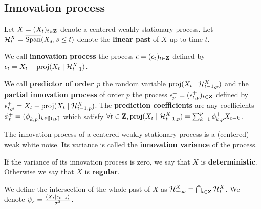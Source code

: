 \subsection{Innovation process}

	Let $X = (X_t)_{t \in \mathbf{Z}}$ denote a centered weakly stationary process.
	Let $\mathcal{H}_t^X = \overline{\operatorname{Span}}(X_s, s \leq t)$ denote the \textbf{linear past} of $X$ up to time $t$.

	\begin{defn}
		We call \textbf{innovation process} the process $\epsilon = (\epsilon_t)_{t \in \mathbf{Z}}$ defined by $\epsilon_t = X_t - \operatorname{proj}(X_t \mid \mathcal{H}_{t - 1}^X)$.
	\end{defn}

	\begin{defn}
		We call \textbf{predictor of order $p$} the random variable $\operatorname{proj}(X_t \mid \mathcal{H}_{t - 1,p}^X)$ and the \textbf{partial innovation process} of order $p$ the process $\epsilon_p^+ = (\epsilon_{t,p}^+)_{t \in \mathbf{Z}}$ defined by $\epsilon_{t,p}^+ = X_t - \operatorname{proj}(X_t \mid \mathcal{H}_{t - 1,p}^X)$.
		The \textbf{prediction coefficients} are any coefficients $\phi_p^+ = (\phi_{k,p}^+)_{k \in \mathopen{[\![}1\mathclose{}\mathpunct{};p\mathclose{]\!]}}$ which satisfy $\forall t \in \mathbf{Z}, \operatorname{proj}(X_t \mid \mathcal{H}_{t - 1,p}^X) = \sum_{k = 1}^p \phi_{k,p}^+ X_{t - k}$.
	\end{defn}
	
	\begin{cor}
		The innovation process of a centered weakly stationary process is a (centered) weak white noise.
		Its variance is called the \textbf{innovation variance} of the process.
	\end{cor}

	\begin{defn}
		If the variance of its innovation process is zero, we say that $X$ is \textbf{deterministic}.
		Otherwise we say that $X$ is \textbf{regular}.
	\end{defn}

	We define the intersection of the whole past of $X$ as $\mathcal{H}_{-\infty}^X = \bigcap_{t \in \mathbf{Z}} \mathcal{H}_t^X$.
	We denote $\psi_s = \frac{\left\langle X_t \mid \epsilon_{t - s} \right\rangle}{\sigma^2}$.
	
